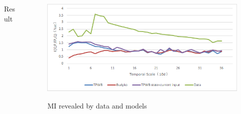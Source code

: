 \documentclass[final]{beamer}
\newlength{\onecolwid}
\begin{document}
\begin{frame}[t]
\begin{columns}[t]
\begin{column}{\onecolwid}
\begin{block}{Result}
 
 
 
 
 
 
 

\end{block}

 

 
 

 


\end{column} %





 



\begin{column}{\onecolwid} %
\begin{block}{ }
\begin{figure}
\includegraphics[width=0.8\linewidth]{model.png}

MI revealed by data and models
\end{figure}

 
 


 

\end{block}


\end{column}
\end{columns}
\end{frame}
\end{document}
